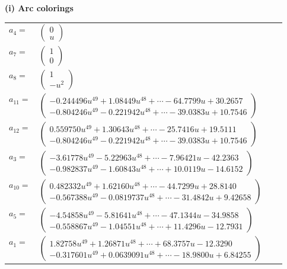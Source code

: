 \documentclass[1p]{elsarticle_modified}
\theoremstyle{definition}
\begin{document}
\flushleft \textbf{(i) Arc colorings}\\
\begin{tabular}{m{7pt} m{180pt} m{7pt} m{180pt} }
\flushright $a_{4}=$&$\begin{pmatrix}0\\u\end{pmatrix}$ \\
\flushright $a_{7}=$&$\begin{pmatrix}1\\0\end{pmatrix}$ \\
\flushright $a_{8}=$&$\begin{pmatrix}1\\- u^2\end{pmatrix}$ \\
\flushright $a_{11}=$&$\begin{pmatrix}-0.244496 u^{49}+1.08449 u^{48}+\cdots-64.7799 u+30.2657\\-0.804246 u^{49}-0.221942 u^{48}+\cdots-39.0383 u+10.7546\end{pmatrix}$ \\
\flushright $a_{12}=$&$\begin{pmatrix}0.559750 u^{49}+1.30643 u^{48}+\cdots-25.7416 u+19.5111\\-0.804246 u^{49}-0.221942 u^{48}+\cdots-39.0383 u+10.7546\end{pmatrix}$ \\
\flushright $a_{3}=$&$\begin{pmatrix}-3.61778 u^{49}-5.22963 u^{48}+\cdots-7.96421 u-42.2363\\-0.982837 u^{49}-1.60843 u^{48}+\cdots+10.0119 u-14.6152\end{pmatrix}$ \\
\flushright $a_{10}=$&$\begin{pmatrix}0.482332 u^{49}+1.62160 u^{48}+\cdots-44.7299 u+28.8140\\-0.567388 u^{49}-0.0819737 u^{48}+\cdots-31.4842 u+9.42658\end{pmatrix}$ \\
\flushright $a_{5}=$&$\begin{pmatrix}-4.54858 u^{49}-5.81641 u^{48}+\cdots-47.1344 u-34.9858\\-0.558867 u^{49}-1.04551 u^{48}+\cdots+11.4296 u-12.7931\end{pmatrix}$ \\
\flushright $a_{1}=$&$\begin{pmatrix}1.82758 u^{49}+1.26871 u^{48}+\cdots+68.3757 u-12.3290\\-0.317601 u^{49}+0.0639091 u^{48}+\cdots-18.9800 u+6.84255\end{pmatrix}$ \\

\end{tabular}
\end{document}

